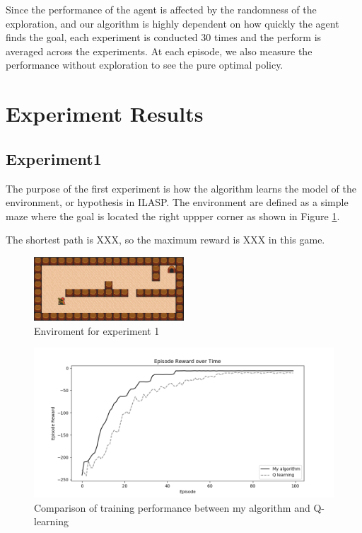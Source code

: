 Since the performance of the agent is affected by the randomness of the exploration, 
and our algorithm is highly dependent on how quickly the agent finds the goal, 
each experiment is conducted 30 times and the perform is averaged across the experiments.
At each episode, we also measure the performance without exploration to see the pure optimal policy.

\section{Experiment Results}
\label{learning_evaluation}

\subsection{Experiment1}
The purpose of the first experiment is how the algorithm learns the model of the environment, or hypothesis in ILASP.
The environment are defined as a simple maze where the goal is located the right uppper corner as shown in Figure \ref{experiment1}.


The shortest path is XXX, so the maximum reward is XXX in this game. 

\begin{figure}[!htb]
\centering
\includegraphics[width=0.5\textwidth]{./figures/experiment1}
\caption{Enviroment for experiment 1}
\label{experiment1}
\end{figure}

\begin{figure}[!htb]
\centering
\includegraphics[width=1.0\textwidth]{./figures/experiment1_training}
\caption{Comparison of training performance between my algorithm and Q-learning}
\label{experiment1_training}
\end{figure}

